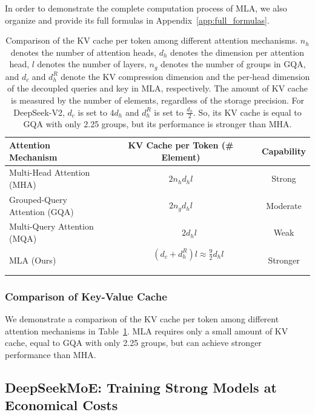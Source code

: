 \documentclass[11pt, a4paper, logo, copyright, nonumbering]{deepseek}
\newcommand{\dsvii}{DeepSeek-V2}
\newcommand{\dsattn}{MLA}
\newcommand{\dsmoe}{DeepSeekMoE}
\begin{document}
\begin{CJK*}{UTF8}{gbsn}
In order to demonstrate the complete computation process of \dsattn{}, we also organize and provide its full formulas in Appendix~\ref{app:full_formulas}. 

\begin{table}[!t]
\centering
\setlength{\tabcolsep}{12pt}
\begin{tabular}{@{}l c c@{}}
\toprule
\textbf{Attention Mechanism} & \textbf{KV Cache per Token (\# Element)} & \textbf{Capability} \\
\midrule
Multi-Head Attention (MHA) & $2 n_{h} d_{h} l$ & Strong \\
Grouped-Query Attention (GQA) & $2 n_{g} d_{h} l$ & Moderate \\
Multi-Query Attention (MQA) & ~~~~$2 d_{h} l$ & Weak \\
\midrule
\dsattn{} (Ours) & $~~~~~~~~(d_{c} + d_h^R)l \approx \frac{9}{2} d_{h} l$~~~~~~~~~~~~~~~~~~~~~~~ & Stronger \\
\bottomrule
\end{tabular}
\caption{
Comparison of the KV cache per token among different attention mechanisms. 
$n_{h}$ denotes the number of attention heads, 
$d_{h}$ denotes the dimension per attention head, 
$l$ denotes the number of layers, 
$n_{g}$ denotes the number of groups in GQA, 
and $d_{c}$ and $d_h^R$ denote the KV compression dimension and the per-head dimension of the decoupled queries and key in \dsattn{}, respectively. 
The amount of KV cache is measured by the number of elements, regardless of the storage precision.
For \dsvii{}, $d_{c}$ is set to $4d_{h}$ and $d_h^R$ is set to $\frac{d_{h}}{2}$. 
So, its KV cache is equal to GQA with only 2.25 groups, but its performance is stronger than MHA. 
}
\label{tab:kv_cache_comp}
\end{table}

\subsubsection{Comparison of Key-Value Cache}

We demonstrate a comparison of the KV cache per token among different attention mechanisms in Table~\ref{tab:kv_cache_comp}. 
\dsattn{} requires only a small amount of KV cache, equal to GQA with only 2.25 groups, but can achieve stronger performance than MHA. 

\subsection{\dsmoe{}: Training Strong Models at Economical Costs}


\end{CJK*}
\end{document}
